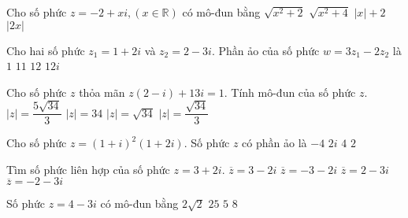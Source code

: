 \begin{ex}%
	Cho số phức $z=-2+xi, (x \in \mathbb{R})$ có mô-đun bằng
	\choice
	{$\sqrt{x^2+2}$}
	{\True $\sqrt{x^2+4}$}
	{$|x|+2$}
	{$|2x|$}
\end{ex}

\begin{ex}%
	Cho hai số phức $z_1=1+2i$ và $z_2=2-3i$. Phần ảo của số phức $w=3z_1-2z_2$ là
	\choice
	{$1$}
	{$11$}
	{\True $12$}
	{$12i$}
\end{ex}

\begin{ex}%
	Cho số phức $z$ thỏa mãn $z(2-i)+13i=1$. Tính mô-đun của số phức $z$.
	\choice
	{$|z|=\dfrac{5\sqrt{34}}{3}$}
	{$|z|=34$}
	{\True $|z|=\sqrt{34}$}
	{$|z|=\dfrac{\sqrt{34}}{3}$}
\end{ex}

\begin{ex}%
	Cho số phức $z=(1+i)^2(1+2i)$. Số phức $z$ có phần ảo là
	\choice
	{$-4$}
	{$2i$}
	{$4$}
	{\True $2$}
\end{ex}

\begin{ex}%
	Tìm số phức liên hợp của số phức $z=3+2i$.
	\choice
	{\True $\overline{z}=3-2i$}
	{$\overline{z}=-3-2i$}
	{$\overline{z}=2-3i$}
	{$\overline{z}=-2-3i$}
\end{ex}

\begin{ex}%
	Số phức $z=4-3i$ có mô-đun bằng
	\choice
	{$2\sqrt{2}$}
	{$25$}
	{\True $5$}
	{$8$}
\end{ex}

